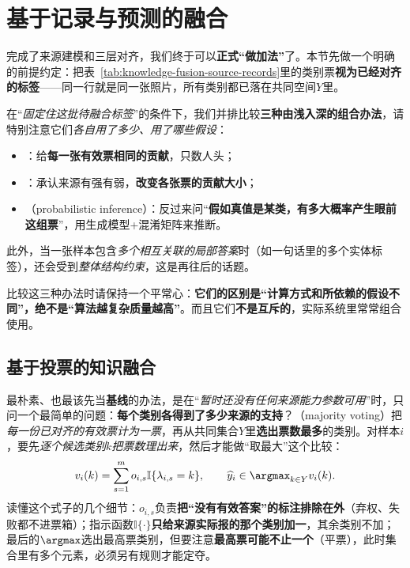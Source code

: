 \section{基于记录与预测的融合}
\label{sec:knowledge-fusion-inference}

完成了来源建模和三层对齐，我们终于可以\textbf{正式“做加法”}了。本节先做一个明确的前提约定：把表~\ref{tab:knowledge-fusion-source-records}里的类别票\textbf{视为已经对齐的标签}——同一行就是同一张照片，所有类别都已落在共同空间$Y$里。

在“\emph{固定住这批待融合标签}”的条件下，我们并排比较\textbf{三种由浅入深的组合办法}，请特别注意它们\emph{各自用了多少、用了哪些假设}：
\begin{itemize}\item {}：给\textbf{每一张有效票相同的贡献}，只数人头；\item {}：承认来源有强有弱，\textbf{改变各张票的贡献大小}；\item {}（probabilistic inference）：反过来问“\textbf{假如真值是某类，有多大概率产生眼前这组票}”，用生成模型+混淆矩阵来推断。\end{itemize}
此外，当一张样本包含\emph{多个相互关联的局部答案}时（如一句话里的多个实体标签），还会受到\emph{整体结构约束}，这是再往后的话题。

比较这三种办法时请保持一个平常心：\textbf{它们的区别是“计算方式和所依赖的假设不同”，绝不是“算法越复杂质量越高”}。而且它们\textbf{不是互斥的}，实际系统里常常组合使用。

\subsection{基于投票的知识融合}
\label{sec:knowledge-fusion-voting}

最朴素、也最该先当\textbf{基线}的办法，是在“\emph{暂时还没有任何来源能力参数可用}”时，只问一个最简单的问题：\textbf{每个类别各得到了多少来源的支持}？（majority voting）把\emph{每一份已对齐的有效票计为一票}，再从共同集合$Y$里\textbf{选出票数最多}的类别。对样本$i$，要先\emph{逐个候选类别}$k$\emph{把票数理出来}，然后才能做“取最大”这个比较：
\begin{equation}
  v_i(k)
  =\sum_{s=1}^{m}o_{i,s}\mathbb{I}\{\lambda_{i,s}=k\},
  \qquad
  \widehat y_i\in\argmax_{k\in Y}v_i(k).
  \label{eq:knowledge-fusion-majority-vote}
\end{equation}
读懂这个式子的几个细节：$o_{i,s}$负责\textbf{把“没有有效答案”的标注排除在外}（弃权、失败都不进票箱）；指示函数$\mathbb{I}\{\cdot\}$\textbf{只给来源实际报的那个类别加一}，其余类别不加；最后的$\argmax$选出最高票类别，但要注意\textbf{最高票可能不止一个}（平票），此时集合里有多个元素，必须另有规则才能定夺。

